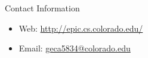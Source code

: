 \documentclass[final]{beamer}
\newlength{\sepwid}
\newlength{\onecolwid}
\begin{document}
\begin{darkframes}
\begin{frame}
\begin{columns}[t]
\begin{column}{\onecolwid}






\begin{block}{Contact Information}

\begin{itemize}
\item Web: \href{http://epic.cs.colorado.edu/}{http://epic.cs.colorado.edu/}
\item Email: \href{mailto:geca5834@colorado.edu}{geca5834@colorado.edu}
\end{itemize}

\end{block}



\end{column} %

\begin{column}{\sepwid}\end{column} %

\end{columns} %

\end{frame} %
\end{darkframes} %
\end{document}
